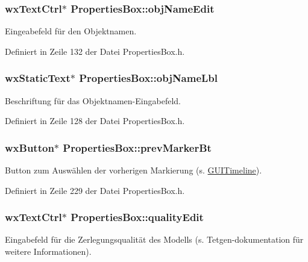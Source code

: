 \hypertarget{classPropertiesBox_a7bb26289d5da39d7996c794216f4d89b}{
\subsubsection[{obj\-Name\-Edit}]{\setlength{\rightskip}{0pt plus 5cm}wx\-Text\-Ctrl$\ast$ Properties\-Box\-::obj\-Name\-Edit\hspace{0.3cm}{\ttfamily [private]}}}\label{classPropertiesBox_a7bb26289d5da39d7996c794216f4d89b}
Eingeabefeld für den Objektnamen. 

Definiert in Zeile 132 der Datei Properties\-Box.\-h.

\hypertarget{classPropertiesBox_ac281563a94d4cdffd51084d88cafc692}{
\subsubsection[{obj\-Name\-Lbl}]{\setlength{\rightskip}{0pt plus 5cm}wx\-Static\-Text$\ast$ Properties\-Box\-::obj\-Name\-Lbl\hspace{0.3cm}{\ttfamily [private]}}}\label{classPropertiesBox_ac281563a94d4cdffd51084d88cafc692}
Beschriftung für das Objektnamen-\/\-Eingabefeld. 

Definiert in Zeile 128 der Datei Properties\-Box.\-h.

\hypertarget{classPropertiesBox_ab315d0ce0bda89ebe2c003d141df2891}{
\subsubsection[{prev\-Marker\-Bt}]{\setlength{\rightskip}{0pt plus 5cm}wx\-Button$\ast$ Properties\-Box\-::prev\-Marker\-Bt\hspace{0.3cm}{\ttfamily [private]}}}\label{classPropertiesBox_ab315d0ce0bda89ebe2c003d141df2891}
Button zum Auswählen der vorherigen Markierung (s. \hyperlink{classGUITimeline}{G\-U\-I\-Timeline}). 

Definiert in Zeile 229 der Datei Properties\-Box.\-h.

\hypertarget{classPropertiesBox_ab01869f0f594e103ea5698a480696b99}{
\subsubsection[{quality\-Edit}]{\setlength{\rightskip}{0pt plus 5cm}wx\-Text\-Ctrl$\ast$ Properties\-Box\-::quality\-Edit\hspace{0.3cm}{\ttfamily [private]}}}\label{classPropertiesBox_ab01869f0f594e103ea5698a480696b99}
Eingabefeld für die Zerlegungsqualität des Modells (s. Tetgen-\/dokumentation für weitere Informationen). 

